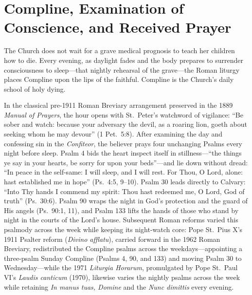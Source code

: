 \section{Compline, Examination of Conscience, and Received Prayer}

The Church does not wait for a grave medical prognosis to teach her children how to die. Every evening, as daylight fades and the body prepares to surrender consciousness to sleep---that nightly rehearsal of the grave---the Roman liturgy places Compline upon the lips of the faithful. Compline is the Church's daily school of holy dying.

In the classical pre-1911 Roman Breviary arrangement preserved in the 1889 \emph{Manual of Prayers}, the hour opens with St.\ Peter's watchword of vigilance: ``Be sober and watch: because your adversary the devil, as a roaring lion, goeth about seeking whom he may devour'' (1 Pet.\ 5:8). After examining the day and confessing sin in the \emph{Confiteor}, the believer prays four unchanging Psalms every night before sleep. Psalm 4 bids the heart inspect itself in stillness---``the things ye say in your hearts, be sorry for upon your beds''---and lie down without dread: ``In peace in the self-same: I will sleep, and I will rest. For Thou, O Lord, alone: hast established me in hope'' (Ps.\ 4:5, 9--10). Psalm 30 leads directly to Calvary: ``Into Thy hands I commend my spirit: Thou hast redeemed me, O Lord, God of truth'' (Ps.\ 30:6). Psalm 90 wraps the night in God's protection and the guard of His angels (Ps.\ 90:1, 11), and Psalm 133 lifts the hands of those who stand by night in the courts of the Lord's house. Subsequent Roman reforms varied this psalmody across the week while keeping its night-watch core: Pope St.\ Pius X's 1911 Psalter reform (\emph{Divino afflatu}), carried forward in the 1962 Roman Breviary, redistributed the Compline psalms across the weekdays---appointing a three-psalm Sunday Compline (Psalms 4, 90, and 133) and moving Psalm 30 to Wednesday---while the 1971 \emph{Liturgia Horarum}, promulgated by Pope St.\ Paul VI's \emph{Laudis canticum} (1970), likewise varies the nightly psalms across the week while retaining \emph{In manus tuas, Domine} and the \emph{Nunc dimittis} every evening.

